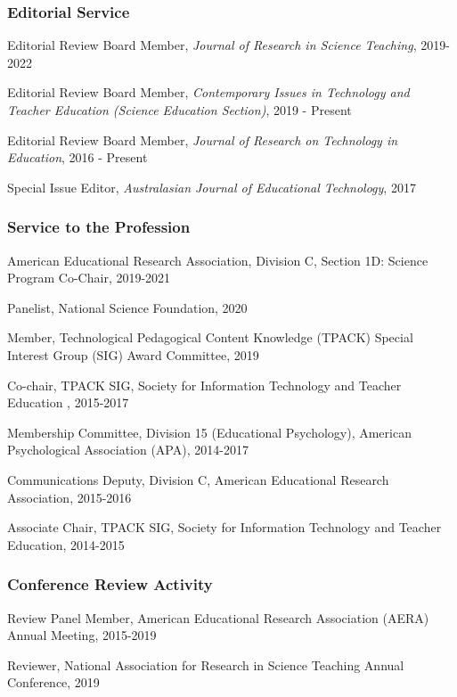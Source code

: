 \documentclass[
  14,
]{article}
\begin{document}
\hypertarget{editorial-service}{%
\subsubsection{Editorial Service}\label{editorial-service}}

Editorial Review Board Member, \emph{Journal of Research in Science
Teaching}, 2019-2022

Editorial Review Board Member, \emph{Contemporary Issues in Technology
and Teacher Education (Science Education Section)}, 2019 - Present

Editorial Review Board Member, \emph{Journal of Research on Technology
in Education}, 2016 - Present

Special Issue Editor, \emph{Australasian Journal of Educational
Technology}, 2017

\hypertarget{service-to-the-profession}{%
\subsubsection{Service to the
Profession}\label{service-to-the-profession}}

American Educational Research Association, Division C, Section 1D:
Science Program Co-Chair, 2019-2021

Panelist, National Science Foundation, 2020

Member, Technological Pedagogical Content Knowledge (TPACK) Special
Interest Group (SIG) Award Committee, 2019

Co-chair, TPACK SIG, Society for Information Technology and Teacher
Education , 2015-2017

Membership Committee, Division 15 (Educational Psychology), American
Psychological Association (APA), 2014-2017

Communications Deputy, Division C, American Educational Research
Association, 2015-2016

Associate Chair, TPACK SIG, Society for Information Technology and
Teacher Education, 2014-2015

\hypertarget{conference-review-activity}{%
\subsubsection{Conference Review
Activity}\label{conference-review-activity}}

Review Panel Member, American Educational Research Association (AERA)
Annual Meeting, 2015-2019

Reviewer, National Association for Research in Science Teaching Annual
Conference, 2019
\end{document}
